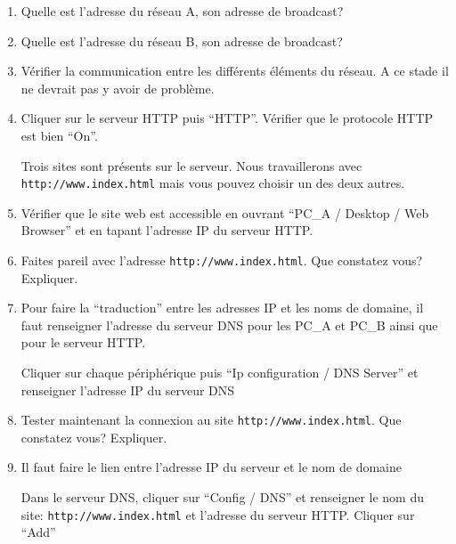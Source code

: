 \begin{exercice_cours}{}
\begin{enumerate}
        \item Quelle est l'adresse du réseau A, son adresse de broadcast? \dotfill{}
        \item Quelle est l'adresse du réseau B, son adresse de broadcast? \dotfill{}
        \item Vérifier la communication entre les différents éléments du réseau. A ce stade il ne devrait pas y avoir de problème.
        \item Cliquer sur le serveur HTTP puis ``HTTP''. Vérifier que le protocole HTTP est bien ``On''.
        \medskip

        Trois sites sont présents sur le serveur. Nous travaillerons avec \verb+http://www.index.html+ mais vous pouvez choisir un des deux autres.
        \item Vérifier que le site web est accessible en ouvrant ``PC\_A / Desktop / Web Browser'' et en tapant l'adresse IP du serveur HTTP.
        \item Faites pareil avec l'adresse \verb+http://www.index.html+. Que constatez vous? Expliquer.
        
        \begin{tcolorbox}[height = 2cm]
        
        \end{tcolorbox}

        \item Pour faire la ``traduction'' entre les adresses IP et les noms de domaine, il faut renseigner l'adresse du serveur DNS pour les PC\_A et PC\_B ainsi que pour le serveur HTTP.
        
        Cliquer sur chaque périphérique puis ``Ip configuration / DNS Server'' et renseigner l'adresse IP du serveur DNS
    
        \item Tester maintenant la connexion au site \verb+http://www.index.html+. Que constatez vous? Expliquer.
        
        \begin{tcolorbox}[height = 2cm]
        
        \end{tcolorbox}

        \item Il faut faire le lien entre l'adresse IP du serveur et le nom de domaine
        
        Dans le serveur DNS, cliquer sur ``Config / DNS'' et renseigner le nom du site: \verb+http://www.index.html+ et l'adresse du serveur HTTP. Cliquer sur ``Add''


\end{enumerate}
\end{exercice_cours}
